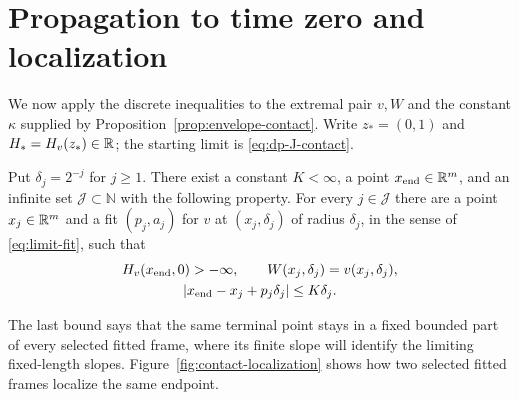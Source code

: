 \section{Propagation to time zero and localization}\label{sec:contact-localization}

We now apply the discrete inequalities to the extremal pair $v,W$ and the
constant $\kappa$ supplied by Proposition~\ref{prop:envelope-contact}.  Write
$z_*=(0,1)$ and $H_*=H_v(z_*)\in\mathbb{R}$; the starting limit is
\eqref{eq:dp-J-contact}.

\begin{proposition}\label{prop:contact-propagation}
Put $\delta_j=2^{-j}$ for $j\ge1$.  There exist a constant $K<\infty$, a point
$x_{\rm end}\in\mathbb{R}^m$, and an infinite set $\mathcal J\subset\mathbb N$ with the
following property.  For every $j\in\mathcal J$ there are a point
$x_j\in\mathbb{R}^m$ and a fit $(p_j,a_j)$ for $v$ at $(x_j,\delta_j)$ of radius
$\delta_j$, in the sense of \eqref{eq:limit-fit}, such that
\begin{equation}\label{eq:contact-propagation-conclusion}
\begin{gathered}
  H_v(x_{\rm end},0)>-\infty,\qquad
  W(x_j,\delta_j)=v(x_j,\delta_j),\\
  |x_{\rm end}-x_j+p_j\delta_j|\le K\delta_j.
\end{gathered}
\end{equation}
\end{proposition}

The last bound says that the same terminal point stays in a fixed bounded
part of every selected fitted frame, where its finite slope will identify
the limiting fixed-length slopes. Figure~\ref{fig:contact-localization}
shows how two selected fitted frames localize the same endpoint.



